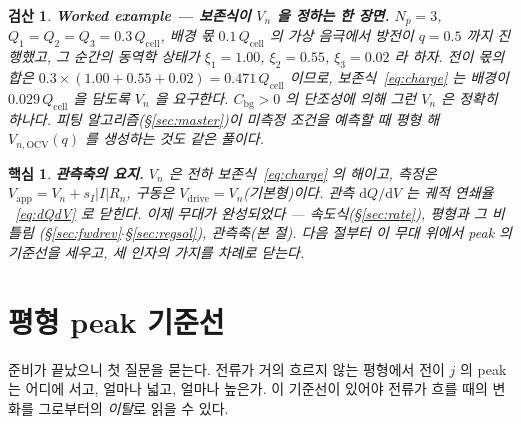 \documentclass[11pt,a4paper]{article}
\newtheorem*{keybox}{핵심}
\newtheorem*{verifybox}{검산}
\newcommand{\dd}{\mathrm{d}}
\newcommand{\app}{\mathrm{app}}
\newcommand{\drive}{\mathrm{drive}}
\newcommand{\cell}{\mathrm{cell}}
\newcommand{\bg}{\mathrm{bg}}
\newcommand{\OCV}{\mathrm{OCV}}
\begin{document}
\begin{verifybox}
\textbf{Worked example — 보존식이 $V_n$ 을 정하는 한 장면.} $N_p=3$,
$Q_1=Q_2=Q_3=0.3\,Q_\cell$, 배경 몫 $0.1\,Q_\cell$ 의 가상 음극에서 방전이 $q=0.5$ 까지 진행했고, 그
순간의 동역학 상태가 $\xi_1=1.00$, $\xi_2=0.55$, $\xi_3=0.02$ 라 하자. 전이 몫의 합은
$0.3\times(1.00+0.55+0.02)=0.471\,Q_\cell$ 이므로, 보존식~\eqref{eq:charge} 는 배경이
$0.029\,Q_\cell$ 을 담도록 $V_n$ 을 요구한다. $C_\bg>0$ 의 단조성에 의해 그런 $V_n$ 은 정확히 하나다.
피팅 알고리즘(\S\ref{sec:master})이 미측정 조건을 예측할 때 평형 해 $V_{n,\OCV}(q)$ 를 생성하는 것도
같은 풀이다.
\end{verifybox}

\begin{keybox}
\textbf{관측축의 요지.} $V_n$ 은 전하 보존식~\eqref{eq:charge} 의 해이고, 측정은
$V_\app=V_n+s_I|I|R_n$, 구동은 $V_\drive=V_n$(기본형)이다. 관측 $\dd Q/\dd V$ 는 궤적 연쇄율
~\eqref{eq:dQdV} 로 닫힌다. 이제 무대가 완성되었다 — 속도식(\S\ref{sec:rate}), 평형과 그 비틀림
(\S\ref{sec:fwdrev}$\cdot$\S\ref{sec:regsol}), 관측축(본 절). 다음 절부터 이 무대 위에서 peak 의
기준선을 세우고, 세 인자의 가지를 차례로 닫는다.
\end{keybox}

\section{평형 peak 기준선}\label{sec:eqpeak}
준비가 끝났으니 첫 질문을 묻는다. 전류가 거의 흐르지 않는 평형에서 전이 $j$ 의 peak 는 어디에 서고,
얼마나 넓고, 얼마나 높은가. 이 기준선이 있어야 전류가 흐를 때의 변화를 그로부터의 \emph{이탈}로 읽을 수
있다.
\end{document}
